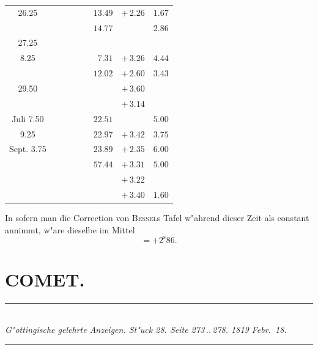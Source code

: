 \documentclass[12pt,a4paper]{article}
\begin{document}
\begin{center}
\begin{tabular}{c|c|c|c|c}
\phantom{0}\phantom{0} 26.25 & & $\phantom{0}\phantom{0}\phantom{0}\phantom{0}\phantom{0}\phantom{0}\phantom{0}13.49$ & $+\,2.26$ & $1.67$ \\
& & $\phantom{0}\phantom{0}\phantom{0}\phantom{0}\phantom{0}\phantom{0}\phantom{0}14.77$ & & $2.86$ \\
\phantom{0}\phantom{0} 27.25 & & & & \\
\phantom{0}\phantom{0}\phantom{0} 8.25 & & $\phantom{0}\phantom{0}\phantom{0}\phantom{0}\phantom{0}\phantom{0}\phantom{0}\phantom{0}7.31$ & $+\,3.26$ & $4.44$ \\
& & $\phantom{0}\phantom{0}\phantom{0}\phantom{0}\phantom{0}\phantom{0}\phantom{0}12.02$ & $+\,2.60$ & $3.43$ \\
\phantom{0}\phantom{0} 29.50 & & & $+\,3.60$ & \\
& & & $+\,3.14$ & \\
Juli \phantom{0}\phantom{0} 7.50 & & $\phantom{0}\phantom{0}\phantom{0}\phantom{0}\phantom{0}\phantom{0}\phantom{0}22.51$ & & $5.00$ \\
\phantom{0}\phantom{0}\phantom{0} 9.25 & & $\phantom{0}\phantom{0}\phantom{0}\phantom{0}\phantom{0}\phantom{0}\phantom{0}22.97$ & $+\,3.42$ & $3.75$ \\
Sept. \phantom{0} 3.75 & & $\phantom{0}\phantom{0}\phantom{0}\phantom{0}\phantom{0}\phantom{0}\phantom{0}23.89$ & $+\,2.35$ & $6.00$ \\
& & $\phantom{0}\phantom{0}\phantom{0}\phantom{0}\phantom{0}\phantom{0}\phantom{0}57.44$ & $+\,3.31$ & $5.00$ \\
& & & $+\,3.22$ & \\
& & & $+\,3.40$ & $1.60$ \\
\bottomrule
\end{tabular}
\end{center}

In sofern man die Correction von \textsc{Bessel}s Tafel w"ahrend dieser Zeit als constant annimmt, w"are
dieselbe im Mittel
\[= +2^{\mathrm{s}}86.\]

\newpage

\section*{COMET.}

\begin{center}
\rule{0.6\textwidth}{0.4pt}\\[0.5em]
\textit{G"ottingische gelehrte Anzeigen. St"uck 28. Seite 273\,..\,278. 1819 Febr.~18.}\\[0.3em]
\rule{0.6\textwidth}{0.4pt}
\end{center}
\end{document}
